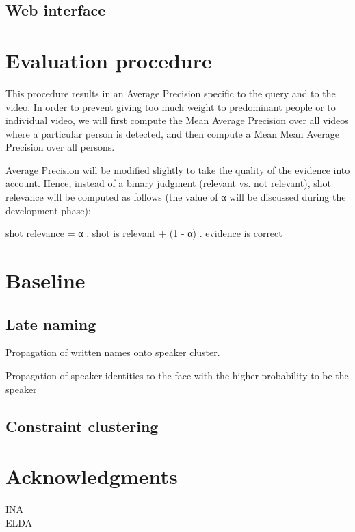 \documentclass{acm_proc_article-me}
\begin{document}
\subsection{Web interface}

\section{Evaluation procedure}

This procedure results in an Average Precision specific to the query and to the video. In order to prevent giving too much weight to predominant people or to individual video, we will first compute the Mean Average Precision over all videos where a particular person is detected, and then compute a Mean Mean Average Precision over all persons.

Average Precision will be modified slightly to take the quality of the evidence into account. Hence, instead of a binary judgment (relevant vs. not relevant), shot relevance will be computed as follows (the value of α will be discussed during the development phase):

{shot relevance} = α . {shot is relevant} + (1 - α) . {evidence is correct}



\section{Baseline}

\subsection{Late naming}

Propagation of written names onto speaker cluster. 

Propagation of speaker identities to the face with the higher probability to be the speaker

\subsection{Constraint clustering}



\section{Acknowledgments}

INA \\
ELDA \\



\end{document}

